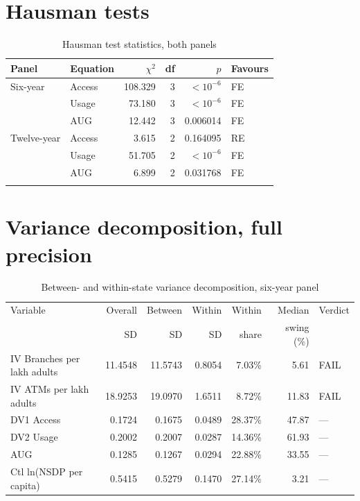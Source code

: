 \section{Hausman tests}
\label{sec:app-hausman}

\begin{table}[H]
\centering
\caption{Hausman test statistics, both panels}
\label{tab:app-hausman}
\small
\begin{tabular}{@{}llrrrl@{}}
\toprule
Panel & Equation & $\chi^2$ & df & $p$ & Favours \\
\midrule
Six-year & Access & 108.329 & 3 & $<10^{-6}$ & FE \\
 & Usage & 73.180 & 3 & $<10^{-6}$ & FE \\
 & AUG & 12.442 & 3 & 0.006014 & FE \\
\addlinespace
Twelve-year & Access & 3.615 & 2 & 0.164095 & RE \\
 & Usage & 51.705 & 2 & $<10^{-6}$ & FE \\
 & AUG & 6.899 & 2 & 0.031768 & FE \\
\addlinespace
\bottomrule
\end{tabular}
\end{table}

\section{Variance decomposition, full precision}
\label{sec:app-within}

\begin{table}[H]
\centering
\caption{Between- and within-state variance decomposition, six-year panel}
\label{tab:app-within}
\footnotesize
\begin{tabular}{@{}lrrrrrl@{}}
\toprule
Variable & Overall & Between & Within & Within & Median & Verdict \\
 & SD & SD & SD & share & swing (\%) & \\
\midrule
IV  Branches per lakh adults & 11.4548 & 11.5743 & 0.8054 & 7.03\% & 5.61 & FAIL \\
IV  ATMs per lakh adults & 18.9253 & 19.0970 & 1.6511 & 8.72\% & 11.83 & FAIL \\
DV1 Access & 0.1724 & 0.1675 & 0.0489 & 28.37\% & 47.87 & --- \\
DV2 Usage & 0.2002 & 0.2007 & 0.0287 & 14.36\% & 61.93 & --- \\
AUG & 0.1285 & 0.1267 & 0.0294 & 22.88\% & 33.55 & --- \\
Ctl ln(NSDP per capita) & 0.5415 & 0.5279 & 0.1470 & 27.14\% & 3.21 & --- \\
\bottomrule
\end{tabular}
\end{table}
